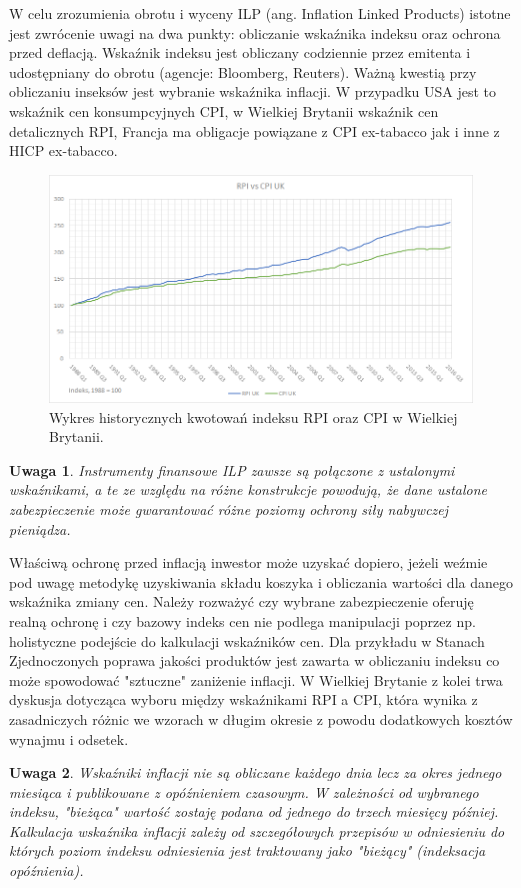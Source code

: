 \documentclass{mini}
\theoremstyle{mythstyle}
\newtheorem{Uwaga}{Uwaga}[chapter]
\begin{document}
	W celu zrozumienia obrotu i wyceny ILP (ang. Inflation Linked Products) istotne jest zwrócenie uwagi na dwa punkty: obliczanie wskaźnika indeksu oraz ochrona przed deflacją. Wskaźnik indeksu jest obliczany codziennie przez emitenta i udostępniany do obrotu (agencje: Bloomberg, Reuters). Ważną kwestią przy obliczaniu inseksów jest wybranie wskaźnika inflacji. W przypadku USA jest to wskaźnik cen konsumpcyjnych CPI, w Wielkiej Brytanii wskaźnik cen detalicznych RPI, Francja ma obligacje powiązane z CPI ex-tabacco jak i inne z HICP ex-tabacco. \\
		\begin{figure} [!h]
		\centering
		\includegraphics[scale=0.65]{graphics/rpivscpi.png}
		\caption{Wykres historycznych kwotowań indeksu RPI oraz CPI w Wielkiej Brytanii.}
	\end{figure}

	\begin{Uwaga}
			Instrumenty finansowe ILP zawsze są połączone z ustalonymi wskaźnikami, a te ze względu na różne konstrukcje powodują, że dane ustalone zabezpieczenie może gwarantować różne poziomy ochrony siły nabywczej pieniądza.
	\end{Uwaga}

	Właściwą ochronę przed inflacją inwestor może uzyskać dopiero, jeżeli weźmie pod uwagę metodykę uzyskiwania składu koszyka i obliczania wartości dla danego wskaźnika zmiany cen. Należy rozważyć czy wybrane zabezpieczenie oferuję realną ochronę i czy bazowy indeks cen nie podlega manipulacji poprzez np. holistyczne podejście do kalkulacji wskaźników cen. Dla przykładu w Stanach Zjednoczonych poprawa jakości produktów jest zawarta w obliczaniu indeksu co może spowodować "sztuczne" zaniżenie inflacji. W Wielkiej Brytanie z kolei trwa dyskusja dotycząca wyboru między wskaźnikami RPI a CPI, która wynika z zasadniczych różnic we wzorach w długim okresie z powodu dodatkowych kosztów wynajmu i odsetek. \\ 
	\begin{Uwaga}
		Wskaźniki inflacji nie są obliczane każdego dnia lecz za okres jednego miesiąca i publikowane z opóźnieniem czasowym. W zależności od wybranego indeksu, "bieżąca" wartość zostaję podana od jednego do trzech miesięcy później. Kalkulacja wskaźnika inflacji zależy od szczegółowych przepisów w odniesieniu do których poziom indeksu odniesienia jest traktowany jako "bieżący" (indeksacja opóźnienia).
	\end{Uwaga}
\end{document}
